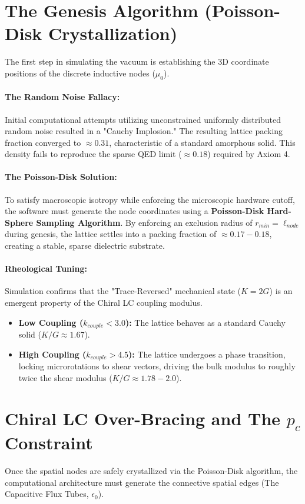 \section{The Genesis Algorithm (Poisson-Disk Crystallization)}
The first step in simulating the vacuum is establishing the 3D coordinate positions of the discrete inductive nodes ($\mu_0$).

\paragraph{The Random Noise Fallacy:} Initial computational attempts utilizing unconstrained uniformly distributed random noise resulted in a "Cauchy Implosion." The resulting lattice packing fraction converged to $\approx 0.31$, characteristic of a standard amorphous solid. This density fails to reproduce the sparse QED limit ($\approx 0.18$) required by Axiom 4.

\paragraph{The Poisson-Disk Solution:} To satisfy macroscopic isotropy while enforcing the microscopic hardware cutoff, the software must generate the node coordinates using a \textbf{Poisson-Disk Hard-Sphere Sampling Algorithm}. By enforcing an exclusion radius of $r_{min} = \ell_{node}$ during genesis, the lattice settles into a packing fraction of $\approx 0.17-0.18$, creating a stable, sparse dielectric substrate.

\paragraph{Rheological Tuning:} Simulation confirms that the "Trace-Reversed" mechanical state ($K=2G$) is an emergent property of the Chiral LC coupling modulus.
\begin{itemize}
    \item \textbf{Low Coupling ($k_{couple} < 3.0$):} The lattice behaves as a standard Cauchy solid ($K/G \approx 1.67$).
    \item \textbf{High Coupling ($k_{couple} > 4.5$):} The lattice undergoes a phase transition, locking microrotations to shear vectors, driving the bulk modulus to roughly twice the shear modulus ($K/G \approx 1.78 - 2.0$).
\end{itemize}

\section{Chiral LC Over-Bracing and The $p_c$ Constraint}
Once the spatial nodes are safely crystallized via the Poisson-Disk algorithm, the computational architecture must generate the connective spatial edges (The Capacitive Flux Tubes, $\epsilon_0$).

